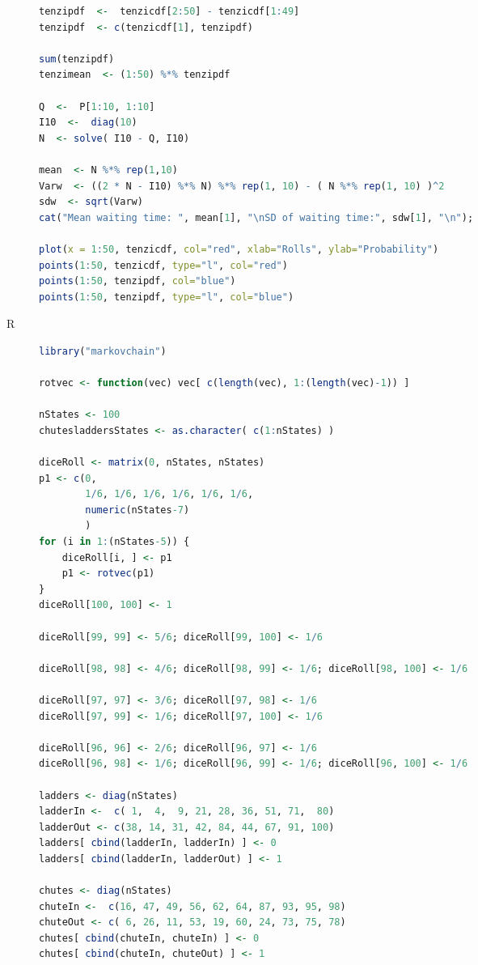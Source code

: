 \begin{description}
\begin{lstlisting}[language=R]
tenzipdf  <-  tenzicdf[2:50] - tenzicdf[1:49]
tenzipdf  <- c(tenzicdf[1], tenzipdf)

sum(tenzipdf)
tenzimean  <- (1:50) %*% tenzipdf

Q  <-  P[1:10, 1:10]
I10  <-  diag(10)
N  <- solve( I10 - Q, I10)

mean  <- N %*% rep(1,10)
Varw  <- ((2 * N - I10) %*% N) %*% rep(1, 10) - ( N %*% rep(1, 10) )^2
sdw  <- sqrt(Varw)
cat("Mean waiting time: ", mean[1], "\nSD of waiting time:", sdw[1], "\n");

plot(x = 1:50, tenzicdf, col="red", xlab="Rolls", ylab="Probability")
points(1:50, tenzicdf, type="l", col="red")
points(1:50, tenzipdf, col="blue")
points(1:50, tenzipdf, type="l", col="blue")
\end{lstlisting}  

\item[R] 


  \begin{lstlisting}[language=R]
library("markovchain")

rotvec <- function(vec) vec[ c(length(vec), 1:(length(vec)-1)) ]

nStates <- 100
chutesladdersStates <- as.character( c(1:nStates) )

diceRoll <- matrix(0, nStates, nStates)
p1 <- c(0,
        1/6, 1/6, 1/6, 1/6, 1/6, 1/6,
        numeric(nStates-7)
        )
for (i in 1:(nStates-5)) {
    diceRoll[i, ] <- p1
    p1 <- rotvec(p1)
}
diceRoll[100, 100] <- 1

diceRoll[99, 99] <- 5/6; diceRoll[99, 100] <- 1/6

diceRoll[98, 98] <- 4/6; diceRoll[98, 99] <- 1/6; diceRoll[98, 100] <- 1/6

diceRoll[97, 97] <- 3/6; diceRoll[97, 98] <- 1/6
diceRoll[97, 99] <- 1/6; diceRoll[97, 100] <- 1/6

diceRoll[96, 96] <- 2/6; diceRoll[96, 97] <- 1/6
diceRoll[96, 98] <- 1/6; diceRoll[96, 99] <- 1/6; diceRoll[96, 100] <- 1/6

ladders <- diag(nStates)
ladderIn <-  c( 1,  4,  9, 21, 28, 36, 51, 71,  80)
ladderOut <- c(38, 14, 31, 42, 84, 44, 67, 91, 100)
ladders[ cbind(ladderIn, ladderIn) ] <- 0
ladders[ cbind(ladderIn, ladderOut) ] <- 1

chutes <- diag(nStates)
chuteIn <-  c(16, 47, 49, 56, 62, 64, 87, 93, 95, 98)
chuteOut <- c( 6, 26, 11, 53, 19, 60, 24, 73, 75, 78)
chutes[ cbind(chuteIn, chuteIn) ] <- 0
chutes[ cbind(chuteIn, chuteOut) ] <- 1


\end{lstlisting}
\end{description}
